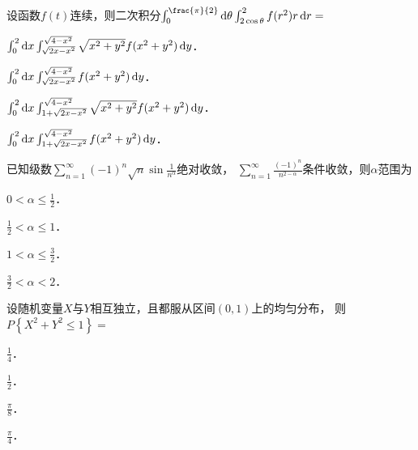 \documentclass[plain,noanswer,medmath]{../../template/jnuexam}
\begin{document}










\begin{problem}
设函数$f(t)$连续，则二次积分$\int_0^{\frac{\pi}{2}} \d\theta \int_{2\cos \theta}^2 f(r^2)r\dr =$\pickout{}
\begin{abcd}
\item $\int_0^2 \mathop{}\!\mathrm{d} x \int_{\sqrt{2x - x^2}}^{\sqrt{4 - x^2}} \sqrt{x^2 + y^2} f(x^2 + y^2)\mathop{}\!\mathrm{d} y$．
\item $\int_0^2 \mathop{}\!\mathrm{d} x \int_{\sqrt{2x - x^2}}^{\sqrt{4 - x^2}} f(x^2 + y^2)\mathop{}\!\mathrm{d} y$．
\item $\int_0^2 \mathop{}\!\mathrm{d} x \int_{1 + \sqrt{2x - x^2}}^{\sqrt{4 - x^2}} \sqrt{x^2 + y^2} f(x^2 + y^2)\mathop{}\!\mathrm{d} y$．
\item $\int_0^2 \mathop{}\!\mathrm{d} x \int_{1 + \sqrt{2x - x^2}}^{\sqrt{4 - x^2}} f(x^2 + y^2)\mathop{}\!\mathrm{d} y$．
\end{abcd}
\end{problem}


\begin{problem}
已知级数$\sum_{n = 1}^{\infty}(- 1)^n\sqrt{n} \sin \frac{1}{n^{\alpha}}$绝对收敛，
$\sum_{n = 1}^{\infty}\frac{(- 1)^n}{n^{2 - \alpha}}$条件收敛，则$\alpha$范围为\pickout{}
\begin{abcd}
\item $0 < \alpha \le \frac{1}{2}$．
\item $\frac{1}{2} < \alpha \le 1$．
\item $1 < \alpha \le \frac{3}{2}$．
\item $\frac{3}{2} < \alpha < 2$．
\end{abcd}
\end{problem}






\begin{problem}
设随机变量$X$与$Y$相互独立，且都服从区间$\left(0,1 \right)$上的均匀分布，\goodbreak
则$P\left\{X^2 + Y^2 \le 1 \right\} =$\pickout{}
\begin{abcd}
\item $\frac{1}{4}$．
\item $\frac{1}{2}$．
\item $\frac{\pi}{8}$．
\item $\frac{\pi}{4}$．
\end{abcd}
\end{problem}
\end{document}
